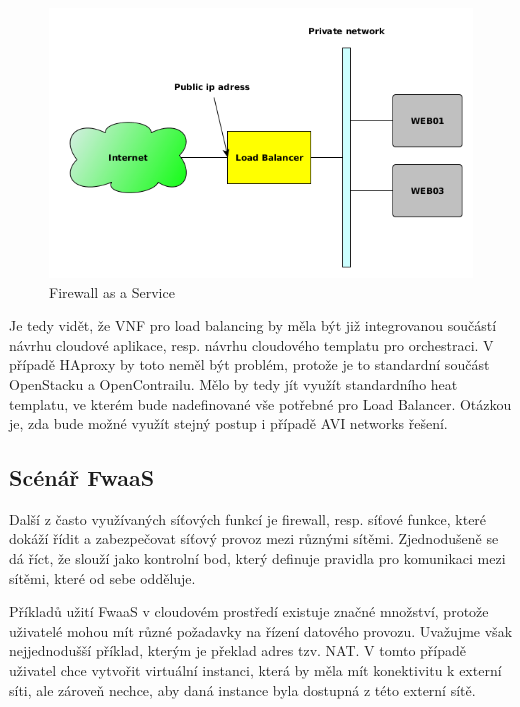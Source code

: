 \begin{figure}[h]
\begin{centering}
\includegraphics[scale=0.6]{images/LoadBalancer}
\par\end{centering}
\caption{Firewall as a Service\label{fig:loadbalancer}}
\end{figure}

Je tedy vidět, že VNF pro load balancing by měla být již integrovanou součástí návrhu cloudové aplikace, resp. návrhu cloudového templatu pro orchestraci. V případě HAproxy by toto neměl být problém, protože je to standardní součást OpenStacku a OpenContrailu. Mělo by tedy jít využít standardního heat templatu, ve kterém bude nadefinované vše potřebné pro Load Balancer. Otázkou je, zda bude možné využít stejný postup i případě AVI networks řešení.

\subsection{Scénář FwaaS}

Další z často využívaných síťových funkcí je firewall, resp. síťové funkce, které dokáží řídit a zabezpečovat síťový provoz mezi různými sítěmi. Zjednodušeně se dá říct, že slouží jako kontrolní bod, který definuje pravidla pro komunikaci mezi sítěmi, které od sebe odděluje.

Příkladů užití FwaaS v cloudovém prostředí existuje značné množství, protože uživatelé mohou mít různé požadavky na řízení datového provozu. Uvažujme však nejjednodušší příklad, kterým je překlad adres tzv. NAT. V tomto případě uživatel chce vytvořit virtuální instanci, která by měla mít konektivitu k externí síti, ale zároveň nechce, aby daná instance byla dostupná z této externí sítě. 

